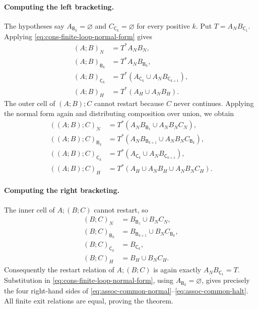 \paragraph{Computing the left bracketing.}
The hypotheses say $A_{\mathsf B_k}=\varnothing$ and
$C_{\mathsf C_k}=\varnothing$ for every positive $k$. Put
$T=A_NB_{\mathsf C_1}$. Applying
\eqref{eq:cons-finite-loop-normal-form} gives
\begin{align*}
 (A;B)_N&=T^*A_NB_N,\\
 (A;B)_{\mathsf B_k}&=T^*A_NB_{\mathsf B_k},\\
 (A;B)_{\mathsf C_k}
   &=T^*(A_{\mathsf C_k}\cup A_NB_{\mathsf C_{k+1}}),\\
 (A;B)_H&=T^*(A_H\cup A_NB_H).
\end{align*}
The outer cell of $(A;B);C$ cannot restart because $C$ never continues.
Applying the normal form again and distributing composition over union,
we obtain
\begin{align}
 ((A;B);C)_N
   &=T^*(A_NB_{\mathsf B_1}\cup A_NB_NC_N),
   \label{eq:assoc-common-normal}\\
 ((A;B);C)_{\mathsf B_k}
   &=T^*(A_NB_{\mathsf B_{k+1}}\cup A_NB_NC_{\mathsf B_k}),
   \label{eq:assoc-common-break}\\
 ((A;B);C)_{\mathsf C_k}
   &=T^*(A_{\mathsf C_k}\cup A_NB_{\mathsf C_{k+1}}),
   \label{eq:assoc-common-continue}\\
 ((A;B);C)_H
   &=T^*(A_H\cup A_NB_H\cup A_NB_NC_H).
   \label{eq:assoc-common-halt}
\end{align}

\paragraph{Computing the right bracketing.}
The inner cell of $A;(B;C)$ cannot restart, so
\begin{align*}
 (B;C)_N&=B_{\mathsf B_1}\cup B_NC_N,\\
 (B;C)_{\mathsf B_k}&=B_{\mathsf B_{k+1}}\cup B_NC_{\mathsf B_k},\\
 (B;C)_{\mathsf C_k}&=B_{\mathsf C_k},\\
 (B;C)_H&=B_H\cup B_NC_H.
\end{align*}
Consequently the restart relation of $A;(B;C)$ is again exactly
$A_NB_{\mathsf C_1}=T$. Substitution in
\eqref{eq:cons-finite-loop-normal-form}, using
$A_{\mathsf B_k}=\varnothing$, gives precisely the four right-hand sides
of \eqref{eq:assoc-common-normal}--\eqref{eq:assoc-common-halt}.
All finite exit relations are equal, proving the theorem.

